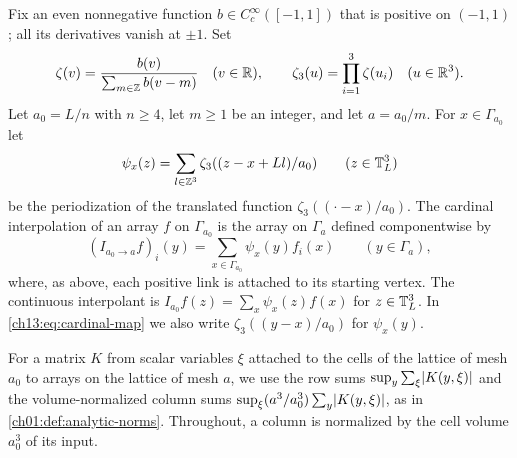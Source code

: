 Fix an even nonnegative function $b\in C_c^\infty([-1,1])$ that is positive on $(-1,1)$; all its derivatives vanish at $\pm1$. Set
\[
 \zeta(v)=\frac{b(v)}{\sum_{m\in\mathbb Z}b(v-m)}\quad(v\in\mathbb R),\qquad\zeta_3(u)=\prod_{i=1}^3\zeta(u_i)\quad(u\in\mathbb R^3).
\]
Let $a_0=L/n$ with $n\ge4$, let $m\ge1$ be an integer, and let $a=a_0/m$. For $x\in\Gamma_{a_0}$ let
\[
 \psi_x(z)=\sum_{l\in\mathbb Z^3}\zeta_3((z-x+Ll)/a_0)\qquad(z\in\mathbb T_L^3)
\]
be the periodization of the translated function $\zeta_3((\cdot-x)/a_0)$. The cardinal interpolation of an array $f$ on $\Gamma_{a_0}$ is the array on $\Gamma_a$ defined componentwise by
\begin{equation}\label{ch13:eq:cardinal-map}
 (I_{a_0\to a}f)_i(y)=\sum_{x\in\Gamma_{a_0}}\psi_x(y)f_i(x)\qquad(y\in\Gamma_a),
\end{equation}
where, as above, each positive link is attached to its starting vertex. The continuous interpolant is $I_{a_0}f(z)=\sum_x\psi_x(z)f(x)$ for $z\in\mathbb T_L^3$. In \eqref{ch13:eq:cardinal-map} we also write $\zeta_3((y-x)/a_0)$ for $\psi_x(y)$.

For a matrix $K$ from scalar variables $\xi$ attached to the cells of the lattice of mesh $a_0$ to arrays on the lattice of mesh $a$, we use the row sums $\sup_y\sum_\xi\lvert K(y,\xi)\rvert$ and the volume-normalized column sums $\sup_\xi(a^3/a_0^3)\sum_y\lvert K(y,\xi)\rvert$, as in \cref{ch01:def:analytic-norms}. Throughout, a column is normalized by the cell volume $a_0^3$ of its input.

